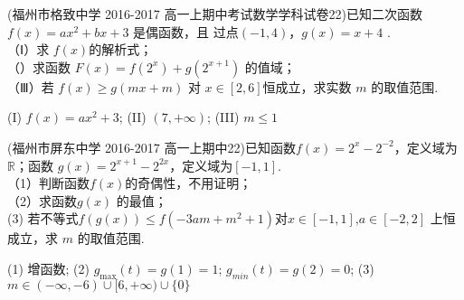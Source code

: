 (福州市格致中学 2016-2017 高一上期中考试数学学科试卷22)已知二次函数 $f ( x )= ax^2+ bx+3$ 是偶函数，且 过点$(-1,4)$，$ g ( x )= x + 4$ .\\
（Ⅰ）求 $f (x) $的解析式；\\
（）求函数 $F ( x )= f (2^x )+ g (2^{x+1} )$ 的值域； \\
（Ⅲ）若 $f ( x ) \geq g ( mx +m )$ 对 $x\in [2, 6] $恒成立，求实数 $m$ 的取值范围.
\begin{answers}
(I) $f(x)=ax^2+3$; (II) $(7,+\infty)$; (III) $m\leq1$
\end{answers}

(福州市屏东中学 2016-2017 高一上期中22)已知函数$f(x)=2^x-2^{-2} $，定义域为$\mathbb{R} $；函数 $g(x)=2^{x+1}-2^{2x} $，定义域为$[-1,1] $.\\
（1）判断函数$f(x) $的奇偶性，不用证明；\\
（2）求函数$g(x) $ 的最值；\\
 (3) 若不等式$f(g(x))\leq f(-3am+m^2+1) $对$x\in[-1,1] $,$a\in[-2,2] $ 上恒成立，求 $m$ 的取值范围.
 \begin{answers}
 (1) 增函数; (2) $g_{\max}(t)=g(1)=1 $; $g_{min}(t)=g(2)=0 $; (3) $m\in (-\infty,-6)\cup[6,+\infty)\cup\{0\} $
\end{answers}















